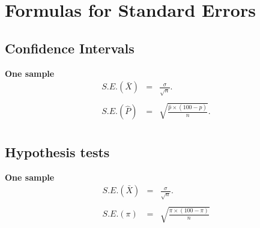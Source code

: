\documentclass[a4paper,12pt]{article}
\begin{document}
\section*{Formulas for Standard Errors}
\subsection*{Confidence Intervals}

{\bf One sample}
\begin{eqnarray*} S.E.(\bar{X})&=&\frac{\sigma}{\sqrt{n}}.\\\\
S.E.(\hat{P})&=&\sqrt{\frac{\hat{p}\times(100-\hat{p})}{n}}.\\
\end{eqnarray*}
\subsection*{Hypothesis tests}
{\bf One sample}
\begin{eqnarray*}
S.E.(\bar{X})&=&\frac{\sigma}{\sqrt{n}}.\\\\
S.E.(\pi)&=&\sqrt{\frac{\pi\times(100-\pi)}{n}}
\end{eqnarray*}
\end{document}
